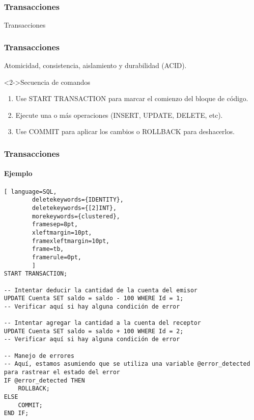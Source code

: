\begin{frame}
    \frametitle{Transacciones}

    \Huge \centering Transacciones

\end{frame}

\begin{frame}[fragile]
    \frametitle{Transacciones}

    Atomicidad, consistencia, aislamiento y durabilidad (ACID).

    \begin{block}<2->{Secuencia de comandos}
    \begin{enumerate}
        \item<3-> Use \textcolor{codepurple}{START TRANSACTION} para marcar el comienzo del bloque de c\'odigo.
        \item<4-> Ejecute una o m\'as operaciones (\textcolor{codepurple}{INSERT}, \textcolor{codepurple}{UPDATE}, \textcolor{codepurple}{DELETE}, etc).
        \item<5-> Use \textcolor{codepurple}{COMMIT} para aplicar los cambios o \textcolor{codepurple}{ROLLBACK} para deshacerlos.
    \end{enumerate}
    \end{block}

\end{frame}

\begin{frame}[fragile]
    \frametitle{Transacciones}
    \framesubtitle{Ejemplo}

	\begin{lstlisting}[ language=SQL,
		deletekeywords={IDENTITY},
		deletekeywords={[2]INT},
		morekeywords={clustered},
		framesep=8pt,
		xleftmargin=10pt,
		framexleftmargin=10pt,
		frame=tb,
		framerule=0pt,
        ]
START TRANSACTION;

-- Intentar deducir la cantidad de la cuenta del emisor
UPDATE Cuenta SET saldo = saldo - 100 WHERE Id = 1;
-- Verificar aquí si hay alguna condición de error

-- Intentar agregar la cantidad a la cuenta del receptor
UPDATE Cuenta SET saldo = saldo + 100 WHERE Id = 2;
-- Verificar aquí si hay alguna condición de error 

-- Manejo de errores
-- Aquí, estamos asumiendo que se utiliza una variable @error_detected para rastrear el estado del error
IF @error_detected THEN
    ROLLBACK;
ELSE
    COMMIT;
END IF;
\end{lstlisting}

\end{frame}